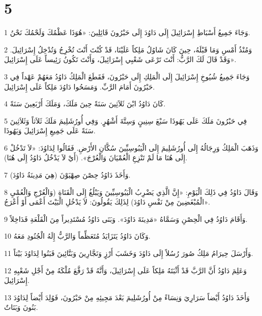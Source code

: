 \chapter{5}

\par 1 وَجَاءَ جَمِيعُ أَسْبَاطِ إِسْرَائِيلَ إِلَى دَاوُدَ إِلَى حَبْرُونَ قَائِلِينَ: «هُوَذَا عَظْمُكَ وَلَحْمُكَ نَحْنُ.
\par 2 وَمُنْذُ أَمْسِ وَمَا قَبْلَهُ، حِينَ كَانَ شَاوُلُ مَلِكاً عَلَيْنَا، قَدْ كُنْتَ أَنْتَ تُخْرِجُ وَتُدْخِلُ إِسْرَائِيلَ. وَقَدْ قَالَ لَكَ الرَّبُّ: أَنْتَ تَرْعَى شَعْبِي إِسْرَائِيلَ، وَأَنْتَ تَكُونُ رَئِيساً عَلَى إِسْرَائِيلَ».
\par 3 وَجَاءَ جَمِيعُ شُيُوخِ إِسْرَائِيلَ إِلَى الْمَلِكِ إِلَى حَبْرُونَ، فَقَطَعَ الْمَلِكُ دَاوُدُ مَعَهُمْ عَهْداً فِي حَبْرُونَ أَمَامَ الرَّبِّ. وَمَسَحُوا دَاوُدَ مَلِكاً عَلَى إِسْرَائِيلَ.
\par 4 كَانَ دَاوُدُ ابْنَ ثَلاَثِينَ سَنَةً حِينَ مَلَكَ، وَمَلَكَ أَرْبَعِينَ سَنَةً.
\par 5 فِي حَبْرُونَ مَلَكَ عَلَى يَهُوذَا سَبْعَ سِنِينٍ وَسِتَّةَ أَشْهُرٍ. وَفِي أُورُشَلِيمَ مَلَكَ ثَلاَثاً وَثَلاَثِينَ سَنَةً عَلَى جَمِيعِ إِسْرَائِيلَ وَيَهُوذَا.
\par 6 وَذَهَبَ الْمَلِكُ وَرِجَالُهُ إِلَى أُورُشَلِيمَ إِلَى الْيَبُوسِيِّينَ سُكَّانِ الأَرْضِ. فَقَالُوا لِدَاوُدَ: «لاَ تَدْخُلْ إِلَى هُنَا مَا لَمْ تَنْزِعِ الْعُمْيَانَ وَالْعُرْجَ». (أَيْ لاَ يَدْخُلُ دَاوُدُ إِلَى هُنَا).
\par 7 وَأَخَذَ دَاوُدُ حِصْنَ صِهْيَوْنَ (هِيَ مَدِينَةُ دَاوُدَ).
\par 8 وَقَالَ دَاوُدُ فِي ذَلِكَ الْيَوْمِ: «إِنَّ الَّذِي يَضْرِبُ الْيَبُوسِيِّينَ وَيَبْلُغُ إِلَى الْقَنَاةِ (وَالْعُرْجِ وَالْعُمْيِ الْمُبْغَضِينَ مِنْ نَفْسِ دَاوُدَ) لِذَلِكَ يَقُولُونَ: لاَ يَدْخُلِ الْبَيْتَ أَعْمَى أَوْ أَعْرَجُ».
\par 9 وَأَقَامَ دَاوُدُ فِي الْحِصْنِ وَسَمَّاهُ «مَدِينَةَ دَاوُدَ». وَبَنَى دَاوُدُ مُسْتَدِيراً مِنَ الْقَلْعَةِ فَدَاخِلاً.
\par 10 وَكَانَ دَاوُدُ يَتَزَايَدُ مُتَعَظِّماً وَالرَّبُّ إِلَهُ الْجُنُودِ مَعَهُ.
\par 11 وَأَرْسَلَ حِيرَامُ مَلِكُ صُورَ رُسُلاً إِلَى دَاوُدَ وَخَشَبَ أَرْزٍ وَنَجَّارِينَ وَبَنَّائِينَ فَبَنُوا لِدَاوُدَ بَيْتاً.
\par 12 وَعَلِمَ دَاوُدُ أَنَّ الرَّبَّ قَدْ أَثْبَتَهُ مَلِكاً عَلَى إِسْرَائِيلَ، وَأَنَّهُ قَدْ رَفَّعَ مُلْكَهُ مِنْ أَجْلِ شَعْبِهِ إِسْرَائِيلَ.
\par 13 وَأَخَذَ دَاوُدُ أَيْضاً سَرَارِيَ وَنِسَاءً مِنْ أُورُشَلِيمَ بَعْدَ مَجِيئِهِ مِنْ حَبْرُونَ، فَوُلِدَ أَيْضاً لِدَاوُدَ بَنُونَ وَبَنَاتٌ.
